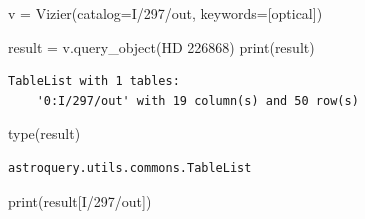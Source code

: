 \documentclass[
  letterpaper,
  DIV=11,
  numbers=noendperiod]{scrreprt}
\newenvironment{Shaded}{\begin{snugshade}}{\end{snugshade}}
\newcommand{\BuiltInTok}[1]{\textcolor[rgb]{0.00,0.23,0.31}{#1}}
\newcommand{\NormalTok}[1]{\textcolor[rgb]{0.00,0.23,0.31}{#1}}
\newcommand{\OperatorTok}[1]{\textcolor[rgb]{0.37,0.37,0.37}{#1}}
\newcommand{\StringTok}[1]{\textcolor[rgb]{0.13,0.47,0.30}{#1}}
\begin{document}
\begin{Shaded}
\begin{Highlighting}[]
\NormalTok{v }\OperatorTok{=}\NormalTok{ Vizier(catalog}\OperatorTok{=}\StringTok{\textquotesingle{}I/297/out\textquotesingle{}}\NormalTok{, keywords}\OperatorTok{=}\NormalTok{[}\StringTok{\textquotesingle{}optical\textquotesingle{}}\NormalTok{])}

\NormalTok{result }\OperatorTok{=}\NormalTok{ v.query\_object(}\StringTok{\textquotesingle{}HD 226868\textquotesingle{}}\NormalTok{)}
\BuiltInTok{print}\NormalTok{(result)}
\end{Highlighting}
\end{Shaded}

\begin{verbatim}
TableList with 1 tables:
    '0:I/297/out' with 19 column(s) and 50 row(s) 
\end{verbatim}

\begin{Shaded}
\begin{Highlighting}[]
\BuiltInTok{type}\NormalTok{(result)}
\end{Highlighting}
\end{Shaded}

\begin{verbatim}
astroquery.utils.commons.TableList
\end{verbatim}

\begin{Shaded}
\begin{Highlighting}[]
\BuiltInTok{print}\NormalTok{(result[}\StringTok{\textquotesingle{}I/297/out\textquotesingle{}}\NormalTok{])}
\end{Highlighting}
\end{Shaded}
\end{document}
